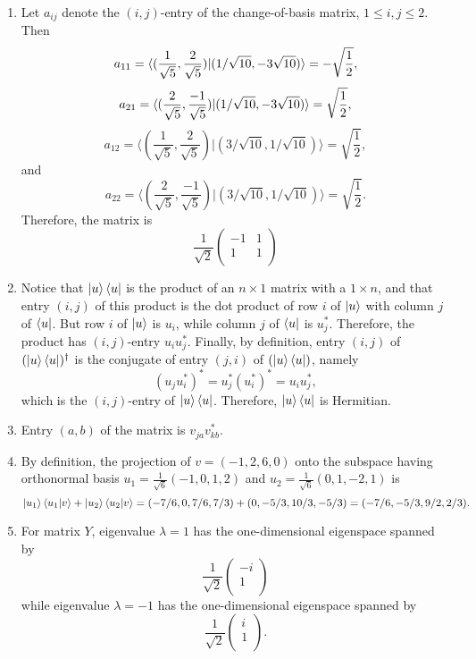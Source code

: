 \documentclass [12pt]{article}
\theoremstyle{definition}
\begin{document}
\begin{enumerate}
\item 
Let $a_{ij}$ denote the $(i,j)$-entry of the change-of-basis matrix, $1\leq i,j\leq 2$. Then
\[a_{11} = \langle (\frac{1}{\sqrt{5}},\frac{2}{\sqrt{5}}) | (1/\sqrt{10},-3\/\sqrt{10}) \rangle = -\sqrt{\frac{1}{2}},\]
\[a_{21} = \langle (\frac{2}{\sqrt{5}},\frac{-1}{\sqrt{5}}) | (1/\sqrt{10},-3\/\sqrt{10}) \rangle = \sqrt{\frac{1}{2}},\]
\[a_{12} = \langle (\frac{1}{\sqrt{5}},\frac{2}{\sqrt{5}}) | (3/\sqrt{10},1/\sqrt{10}) \rangle = \sqrt{\frac{1}{2}},\]
and
\[a_{22} = \langle (\frac{2}{\sqrt{5}},\frac{-1}{\sqrt{5}}) | (3/\sqrt{10},1/\sqrt{10}) \rangle = \sqrt{\frac{1}{2}}.\]
Therefore, the matrix is 
\[
\frac{1}{\sqrt{2}}\left(\begin{array}{cc}
-1 & 1\\
1 & 1 \\
\end{array}\right)\]

\item Notice that $\ket{u}\bra{u}$ is the product of an $n\times 1$ matrix with a $1\times n$, and that entry $(i,j)$ of this product is the dot product of
 row $i$ of $\ket{u}$ with column $j$ of $\bra{u}$. But row $i$ of $\ket{u}$ is $u_i$, while column $j$ of $\bra{u}$ is $u_j^*$. Therefore, the product 
 has $(i,j)$-entry $u_iu_j^*$. Finally, by definition, entry $(i,j)$ of $(\ket{u}\bra{u})^{\dagger}$ is the conjugate of entry $(j,i)$ of 
  $(\ket{u}\bra{u})$, namely 
  \[(u_ju_i^*)^* = u_j^*(u_i^*)^*= u_iu_j^*,\]
  which is the $(i,j)$-entry of $\ket{u}\bra{u}$. Therefore, $\ket{u}\bra{u}$ is Hermitian. 




\item Entry $(a,b)$ of the matrix is $v_{ja}v_{kb}^*$.

\item By definition, the projection of $v=(-1,2,6,0)$ onto the subspace having orthonormal basis $u_{1}=\frac{1}{\sqrt{6}}(-1,0,1,2)$ and $u_{2}=\frac{1}{\sqrt{6}}(0,1,-2,1)$
is
\[\ket{u_1}\braket{u_1|v} + \ket{u_2}\braket{u_2|v} = (-7/6,0,7/6,7/3) + (0,-5/3,10/3,-5/3) = (-7/6,-5/3,9/2,2/3).\]


\item For matrix $Y$, eigenvalue $\lambda = 1$ has the one-dimensional eigenspace spanned by 
\[
\frac{1}{\sqrt{2}}\left(\begin{array}{c}
-i\\
1\\
\end{array}\right)\]
while eigenvalue $\lambda = -1$ has the one-dimensional eigenspace spanned by 
\[
\frac{1}{\sqrt{2}}\left(\begin{array}{c}
i\\
1\\
\end{array}\right).\]


\end{enumerate}
\end{document}
